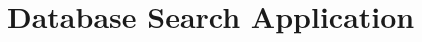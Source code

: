 \documentclass[11pt]{book}
\begin{document}
{\begin{longtable}{p{}p{}}
\hline
\end{longtable}









\chapter{Database Search Application}


}
\end{document}
